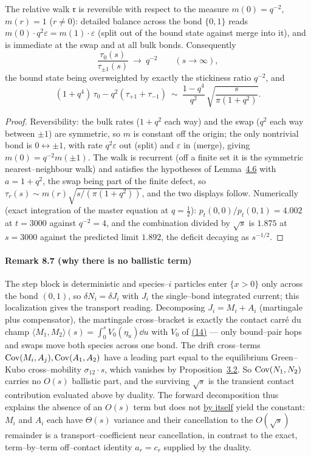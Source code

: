 \documentclass[11pt]{article}
\theoremstyle{plain}
\theoremstyle{definition}
\theoremstyle{remark}
\newcommand{\eps}{\varepsilon}\newcommand{\Exp}{\mathrm{Exp}}
\begin{document}
The relative walk $\mathfrak r$ is reversible with respect to the measure
$m(0)=q^{-2}$, $m(r)=1$ \textup($r\ne0$\textup): detailed balance across the bond
$\{0,1\}$ reads $m(0)\cdot q^2\eps=m(1)\cdot\eps$ \textup(split out of the bound state
against merge into it\textup), and is immediate at the swap and at all bulk bonds.
Consequently
\[
  \frac{\tau_0(s)}{\tau_{\pm1}(s)}\ \longrightarrow\ q^{-2}\qquad(s\to\infty),
\]
the bound state being overweighted by exactly the stickiness ratio $q^{-2}$, and
\[
  (1+q^4)\,\tau_0-q^2(\tau_{+1}+\tau_{-1})\ \sim\
  \frac{1-q^4}{q^{2}}\,\sqrt{\frac{s}{\pi(1+q^2)}}.
\]
\par
\begin{proof}
Reversibility: the bulk rates ($1+q^2$ each way) and the swap ($q^2$ each way between
$\pm1$) are symmetric, so $m$ is constant off the origin; the only nontrivial bond is
$0\leftrightarrow\pm1$, with rate $q^2\eps$ out (split) and $\eps$ in (merge), giving
$m(0)=q^{-2}m(\pm1)$. The walk is recurrent (off a finite set it is the symmetric
nearest--neighbour walk) and satisfies the hypotheses of Lemma~\hyperref[lem_tau]{4.6} with
$a=1+q^2$, the swap being part of the finite defect, so
$\tau_r(s)\sim m(r)\sqrt{s/(\pi(1+q^2))}$, and the two displays follow.
Numerically (exact integration of the master equation at $q=\tfrac12$):
$p_t(0,0)/p_t(0,1)=4.002$ at $t=3000$ against $q^{-2}=4$, and the combination divided
by $\sqrt s$ is $1.875$ at $s=3000$ against the predicted limit $1.892$, the deficit
decaying as $s^{-1/2}$.
\end{proof}

\paragraph{Remark 8.7 (why there is no ballistic term)}\label{rem_noballistic}

The step block is deterministic and species--$i$ particles enter $\{x>0\}$ only across
the bond $(0,1)$, so $\delta N_i=\delta J_i$ with $J_i$ the single--bond integrated
current; this localization gives the transport reading. Decomposing
$J_i=M_i+A_i$ (martingale plus compensator), the martingale cross--bracket is exactly the
contact carr\'e du champ $\langle M_1,M_2\rangle(s)=\int_0^s V_0(\eta_u)\dd u$ with $V_0$
of \hyperref[eq_Vdef]{(14)} --- only bound--pair hops and swaps move both species across one bond.
The drift cross--terms $\operatorname{Cov}(M_i,A_j),\operatorname{Cov}(A_1,A_2)$ have a leading part equal to the
equilibrium Green--Kubo cross--mobility $\sigma_{12}\cdot s$, which vanishes by
Proposition~\hyperref[prop_cross]{3.2}. So $\operatorname{Cov}(N_1,N_2)$ carries no $O(s)$ ballistic part, and
the surviving $\sqrt s$ is the transient contact contribution evaluated above by duality.
The forward decomposition thus explains the absence of an $O(s)$ term but does not
\underline{by itself} yield the constant: $M_i$ and $A_i$ each have $\Theta(s)$ variance and
their cancellation to the $O(\sqrt s)$ remainder is a transport--coefficient near
cancellation, in contrast to the exact, term--by--term off--contact identity
$a_r=c_r$ supplied by the duality.
\par
\end{document}
